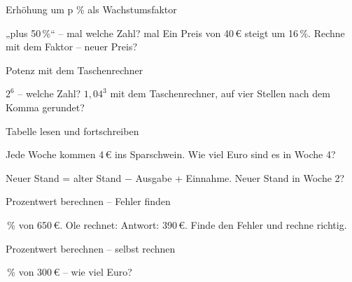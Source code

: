 \begin{aufgabe}{Erhöhung um p \% als Wachstumsfaktor}
\begin{teile}
\teil „plus 50\,\%“ – mal welche Zahl? mal \leerfeld
\teil Ein Preis von 40\,€ steigt um 16\,\%. Rechne mit dem Faktor – neuer Preis? \leerfeld[€]
\end{teile}
\end{aufgabe}

\begin{aufgabe}{Potenz mit dem Taschenrechner}
\begin{teile}
\teil $2^{6}$ – welche Zahl? \leerfeld
\teil $1{,}04^{3}$ mit dem Taschenrechner, auf vier Stellen nach dem Komma gerundet? \leerfeld
\end{teile}
\end{aufgabe}

\begin{aufgabe}{Tabelle lesen und fortschreiben}
\begin{teile}
\teil Jede Woche kommen 4\,€ ins Sparschwein. Wie viel Euro sind es in Woche 4?

\leerfeld[€]
\teil Neuer Stand = alter Stand − Ausgabe + Einnahme. Neuer Stand in Woche 2?

\leerfeld[€]
\end{teile}
\end{aufgabe}

\begin{aufgabe}{Prozentwert berechnen – Fehler finden}
\begin{teile}
\,\% von 650\,€. Ole rechnet:  Antwort: 390\,€. Finde den Fehler und rechne richtig.
\end{teile}
\end{aufgabe}

\begin{aufgabe}{Prozentwert berechnen – selbst rechnen}
\begin{teile}
\,\% von 300\,€ – wie viel Euro? \leerfeld[€]
\end{teile}
\end{aufgabe}
